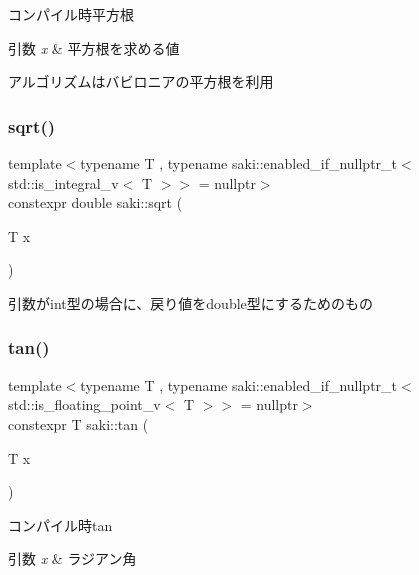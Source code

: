 コンパイル時平方根 


\begin{DoxyParams}{引数}
{\em x} & 平方根を求める値\\
\hline
\end{DoxyParams}
アルゴリズムはバビロニアの平方根を利用 \mbox{\label{namespacesaki_a66fac13294984ad19b8b7fec3b5466b5}} 
\subsubsection{\texorpdfstring{sqrt()}{sqrt()}\hspace{0.1cm}{\footnotesize\ttfamily [2/2]}}
{\footnotesize\ttfamily template$<$typename T , typename saki\+::enabled\+\_\+if\+\_\+nullptr\+\_\+t$<$ std\+::is\+\_\+integral\+\_\+v$<$ T $>$$>$  = nullptr$>$ \\
constexpr double saki\+::sqrt (\begin{DoxyParamCaption}\item[{T}]{x }\end{DoxyParamCaption})}



引数がint型の場合に、戻り値をdouble型にするためのもの 

\mbox{\label{namespacesaki_a491321db8475898649b625dca5401726}} 
\subsubsection{\texorpdfstring{tan()}{tan()}\hspace{0.1cm}{\footnotesize\ttfamily [1/2]}}
{\footnotesize\ttfamily template$<$typename T , typename saki\+::enabled\+\_\+if\+\_\+nullptr\+\_\+t$<$ std\+::is\+\_\+floating\+\_\+point\+\_\+v$<$ T $>$$>$  = nullptr$>$ \\
constexpr T saki\+::tan (\begin{DoxyParamCaption}\item[{T}]{x }\end{DoxyParamCaption})}



コンパイル時tan 


\begin{DoxyParams}{引数}
{\em x} & ラジアン角 \\
\hline
\end{DoxyParams}
\mbox{\label{namespacesaki_a52704083849bbdf4ab635cca985c00ae}} 
